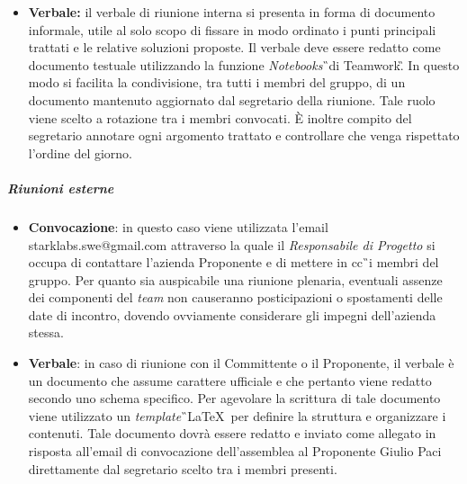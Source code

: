 \begin{itemize}
\item \textbf{Verbale:} il verbale di riunione interna si presenta in forma di documento 
informale, utile al solo scopo di fissare in modo ordinato i punti principali trattati e le relative soluzioni proposte. Il verbale deve essere redatto come documento testuale utilizzando la funzione \textit{Notebooks}\G\ di Teamwork\G. In questo modo si facilita la condivisione, tra tutti i membri del gruppo, di un documento mantenuto aggiornato dal segretario della riunione. Tale ruolo viene scelto a rotazione tra i membri convocati. È inoltre compito del segretario annotare ogni argomento trattato e controllare che venga rispettato l'ordine del giorno.

\end{itemize}

\subparagraph{Riunioni esterne}
\begin{itemize}
\item \textbf{Convocazione}: in questo caso viene utilizzata l'email starklabs.swe@gmail.com attraverso la quale il \textit{Responsabile di Progetto} si occupa di contattare l'azienda Proponente e di mettere in cc\G\ i membri del gruppo. Per quanto sia auspicabile una riunione plenaria, eventuali assenze 
dei componenti del \textit{team} non causeranno posticipazioni o spostamenti delle 
date di incontro, dovendo ovviamente considerare gli impegni dell'azienda stessa.

\item \textbf{Verbale}: in caso di riunione con il Committente o il Proponente, il verbale è un 
documento che assume carattere ufficiale e che pertanto viene redatto secondo uno schema 
specifico.
Per agevolare la scrittura di tale documento viene utilizzato un \textit{template}\G\ 
\LaTeX\ per definire la struttura e organizzare i contenuti. Tale documento 
dovrà essere redatto e inviato come allegato in risposta all'email di convocazione 
dell'assemblea al Proponente Giulio Paci direttamente dal segretario scelto tra i membri presenti. 
\end{itemize}


